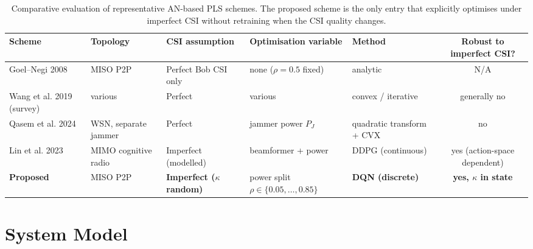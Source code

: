 \documentclass[conference]{IEEEtran}
\begin{document}
\begin{table}[t]
\centering
\caption{Comparative evaluation of representative AN-based PLS schemes.
The proposed scheme is the only entry that explicitly optimises under
imperfect CSI without retraining when the CSI quality changes.}
\label{tab:comparison}
\renewcommand{\arraystretch}{1.2}
\begin{tabular}{@{}lllllc@{}}
\toprule
\textbf{Scheme} & \textbf{Topology} & \textbf{CSI assumption} &
\textbf{Optimisation variable} & \textbf{Method} &
\textbf{Robust to imperfect CSI?} \\
\midrule
Goel--Negi 2008 \cite{goel2008guaranteeing} & MISO P2P & Perfect Bob CSI only
  & none ($\rho = 0.5$ fixed) & analytic & N/A \\
Wang et al. 2019 (survey) \cite{wang2019survey} & various & Perfect
  & various & convex / iterative & generally no \\
Qasem et al. 2024 \cite{qasem2024pls} & WSN, separate jammer & Perfect
  & jammer power $P_J$ & quadratic transform + CVX & no \\
Lin et al. 2023 \cite{lin2023drlpls} & MIMO cognitive radio & Imperfect (modelled)
  & beamformer + power & DDPG (continuous) & yes (action-space dependent) \\
\textbf{Proposed} & MISO P2P & \textbf{Imperfect ($\kappa$ random)}
  & power split $\rho \in \{0.05,\ldots,0.85\}$ & \textbf{DQN (discrete)}
  & \textbf{yes, $\kappa$ in state} \\
\bottomrule
\end{tabular}
\end{table}

\section{System Model}\label{sec:system}
\end{document}
